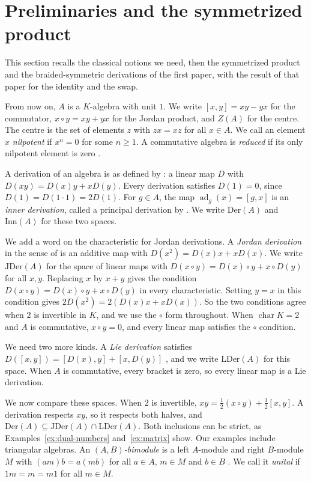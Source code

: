 \documentclass[]{interact}
\theoremstyle{plain}
\theoremstyle{definition}
\theoremstyle{remark}
\newcommand{\Der}{\mathrm{Der}}
\newcommand{\Inn}{\mathrm{Inn}}
\newcommand{\JDer}{\mathrm{JDer}}
\newcommand{\LDer}{\mathrm{LDer}}
\begin{document}
\section{Preliminaries and the symmetrized product}\label{sec:symmetrized}

This section recalls the classical notions we need, then the symmetrized product and the braided-symmetric derivations of the first paper, with the result of that paper for the identity and the swap.


From now on, $A$ is a $K$-algebra with unit $1$.
We write $[x,y] = xy - yx$ for the commutator, $x \circ y = xy + yx$ for the Jordan product, and $Z(A)$ for the centre.
The centre is the set of elements $z$ with $zx = xz$ for all $x \in A$.
We call an element $x$ \emph{nilpotent} if $x^n = 0$ for some $n \geq 1$.
A commutative algebra is \emph{reduced} if its only nilpotent element is zero \citep[1.4.12]{ChambertLoir2021}.

A derivation of an algebra is as defined by \citet[Part I]{Jacobson1937}: a linear map $D$ with $D(xy) = D(x)y + xD(y)$.
Every derivation satisfies $D(1) = 0$, since $D(1) = D(1 \cdot 1) = 2D(1)$.
For $g \in A$, the map $\operatorname{ad}_g(x) = [g,x]$ is an \emph{inner derivation}, called a principal derivation by \citet[\S9.2]{Weibel1994}.
We write $\Der(A)$ and $\Inn(A)$ for these two spaces.

We add a word on the characteristic for Jordan derivations.
A \emph{Jordan derivation} in the sense of \citet[p.~1104]{Herstein1957} is an additive map with $D(x^2) = D(x)x + xD(x)$.
We write $\JDer(A)$ for the space of linear maps with $D(x \circ y) = D(x) \circ y + x \circ D(y)$ for all $x, y$.
Replacing $x$ by $x + y$ gives the condition $D(x \circ y) = D(x) \circ y + x \circ D(y)$ in every characteristic.
Setting $y = x$ in this condition gives $2D(x^2) = 2(D(x)x + xD(x))$.
So the two conditions agree when $2$ is invertible in $K$, and we use the $\circ$ form throughout.
When $\operatorname{char} K = 2$ and $A$ is commutative, $x \circ y = 0$, and every linear map satisfies the $\circ$ condition.

We need two more kinds.
A \emph{Lie derivation} satisfies $D([x,y]) = [D(x), y] + [x, D(y)]$ \citep[p.~183]{Martindale1964}, and we write $\LDer(A)$ for this space.
When $A$ is commutative, every bracket is zero, so every linear map is a Lie derivation.

We now compare these spaces.
When $2$ is invertible, $xy = \tfrac12 (x \circ y) + \tfrac12 [x,y]$.
A derivation respects $xy$, so it respects both halves, and $\Der(A) \subseteq \JDer(A) \cap \LDer(A)$.
Both inclusions can be strict, as Examples~\ref{ex:dual-numbers} and~\ref{ex:matrix} show.
Our examples include triangular algebras.
An \emph{$(A,B)$-bimodule} is a left $A$-module and right $B$-module $M$ with $(am)b = a(mb)$ for all $a \in A$, $m \in M$ and $b \in B$ \citep[Example 1.14]{Lam2001}.
We call it \emph{unital} if $1m = m = m1$ for all $m \in M$.
\end{document}
